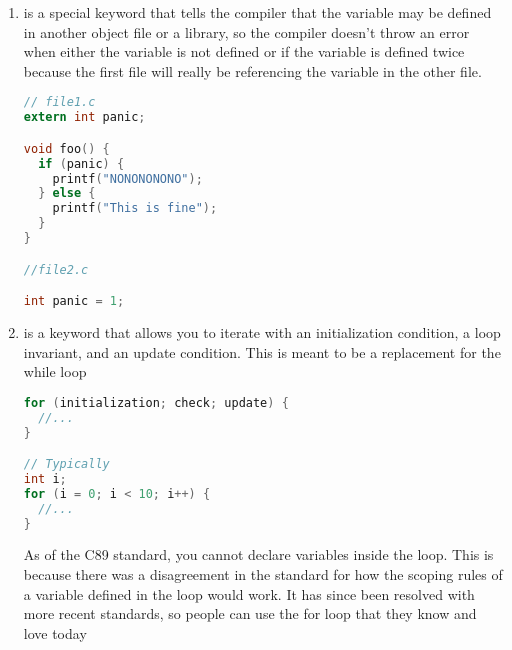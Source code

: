 \begin{enumerate}
\begin{lstlisting}[language=C]
void process_day(enum day foo) {
  switch(foo) {
    case monday:
      printf("Go home!\n"); break;
    // ...
  }
}
\end{lstlisting}

	      It is completely possible to assign enum values to either be different or the same.
        Just don't rely on the compiler for consistent numbering. If you are going to use this abstraction, try not to break it.

	      \begin{lstlisting}[language=C]
enum day{
  monday = 0,
  tuesday = 0,
  wednesday = 0,
  thursday = 1,
  friday = 10,
  saturday = 10,
  sunday = 0};

void process_day(enum day foo) {
  switch(foo) {
    case monday:
      printf("Go home!\n"); break;
    // ...
  }
}
\end{lstlisting}

	    \item {} is a special keyword that tells the compiler that the variable may be defined in another object file or a library, so the compiler doesn't throw an error when either the variable is not defined or if the variable is defined twice because the first file will really be referencing the variable in the other file.

	      \begin{lstlisting}[language=C]
// file1.c
extern int panic;

void foo() {
  if (panic) {
    printf("NONONONONO");
  } else {
    printf("This is fine");
  }
}

//file2.c

int panic = 1;
\end{lstlisting}

	    \item {} is a keyword that allows you to iterate with an initialization condition, a loop invariant, and an update condition.
        This is meant to be a replacement for the while loop

	      \begin{lstlisting}[language=C]
for (initialization; check; update) {
  //...
}

// Typically
int i;
for (i = 0; i < 10; i++) {
  //...
}
\end{lstlisting}

	      As of the C89 standard, you cannot declare variables inside the  loop.
        This is because there was a disagreement in the standard for how the scoping rules of a variable defined in the loop would work.
        It has since been resolved with more recent standards, so people can use the for loop that they know and love today


\end{enumerate}
